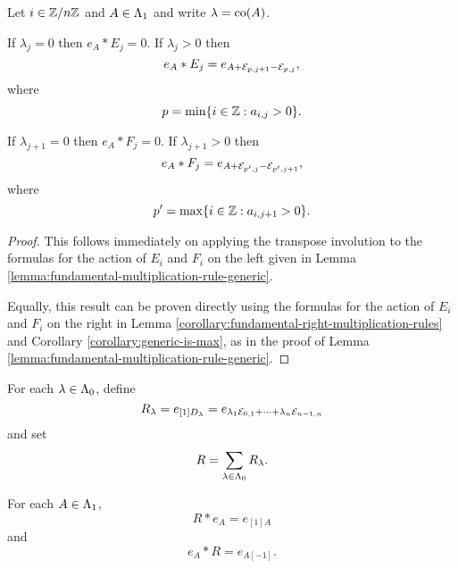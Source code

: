 \documentclass[a4paper, 11pt, twoside]{report}
\begin{document}
\begin{lemma}\label{lemma:multiplication-rule-generic-right}
Let $i\in\mathbb{Z}/{n \mathbb{Z}}$ and $A\in\Lambda_1{}$ and write $\lambda=\operatorname{co}(A)$.

If $\lambda_j=0$ then $e_A\ast E_j=0$. If $\lambda_j>0$ then
\begin{equation*}
e_A\ast E_j =e_{A+\mathcal{E}_{p,j+1}-\mathcal{E}_{p,j}},
\end{equation*}
where
\begin{equation*}
p=\min\{i\in\mathbb{Z}:a_{i,j}>0\}.
\end{equation*}

If $\lambda_{j+1}=0$ then $e_A\ast F_j=0$. If $\lambda_{j+1}>0$ then
\begin{equation*}
e_A\ast F_j = e_{A+\mathcal{E}_{p',j}-\mathcal{E}_{p',j+1}},
\end{equation*}
where
\begin{equation*}
p'=\max\{i\in\mathbb{Z}:a_{i,j+1}>0\}.
\end{equation*}
\end{lemma}

\begin{proof}
This follows immediately on applying the transpose involution to the formulas for the action of $E_i$ and $F_i$ on the left given in Lemma \ref{lemma:fundamental-multiplication-rule-generic}.

Equally, this result can be proven directly using the formulas for the action of $E_i$ and $F_i$ on the right in Lemma \ref{corollary:fundamental-right-multiplication-rules} and Corollary \ref{corollary:generic-is-max}, as in the proof of Lemma \ref{lemma:fundamental-multiplication-rule-generic}.
\end{proof}

For each $\lambda\in\Lambda_0{}$, define
\begin{equation*}
R_\lambda = e_{[1]D_{\lambda}} = e_{\lambda_1\mathcal{E}_{0,1} + \cdots + \lambda_n\mathcal{E}_{n-1,n}}
\end{equation*}
and set
\begin{equation*}
R=\sum_{\lambda\in\Lambda_0{}} R_\lambda.
\end{equation*}

\begin{lemma}\label{lemma:action-of-R-generic}
For each $A\in\Lambda_1{}$,
\begin{equation*}
R\ast e_A = e_{[1]A}
\end{equation*}
and
\begin{equation*}
e_A\ast R = e_{A[-1]}.
\end{equation*}
\end{lemma}
\end{document}
